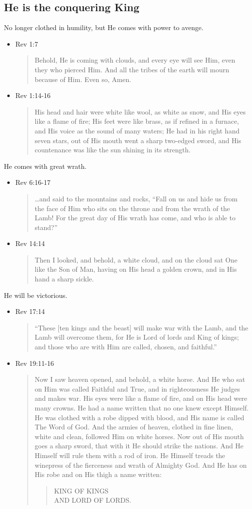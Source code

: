 \documentclass[12pt]{article}
\newcommand{\BI}{\begin{itemize}}
\newcommand{\EI}{\end{itemize}}
\newcommand{\I}{\item}
\newcommand{\Q}[1]{\begin{quote} #1 \end{quote}}
\begin{document}
\subsection{He is the conquering King}
\I No longer clothed in humility, but He comes with power to avenge.
\BI \I Rev 1:7 \Q{Behold, He is coming with clouds, and every eye will see Him, 
                even they who pierced Him. And all the tribes of the earth
                will mourn because of Him. Even so, Amen.}
    \I Rev 1:14-16 \Q{His head and hair were white like wool, as white as snow,
                and His eyes like a flame of fire; His feet were like brass, 
                as if refined in a furnace, and His voice as the sound of 
                many waters; He had in his right hand seven stars, 
                out of His mouth went a sharp two-edged sword, 
                and His countenance was like the sun shining in its strength.}
                \EI
\I He comes with great wrath.
\BI \I Rev 6:16-17 \Q{\ldots and said to the mountains and rocks, 
                ``Fall on us and hide us from the face of Him who sits on the
                throne and from the wrath of the Lamb! For the great day of His
                wrath has come, and who is able to stand?''}
    \I Rev 14:14 \Q{Then I looked, and behold, a white cloud, and on the cloud
                sat One like the Son of Man, having on His head a golden crown, 
                and in His hand a sharp sickle.} \EI
\I He will be victorious.
\BI \I Rev 17:14 \Q{``These [ten kings and the beast] will make war with 
                the Lamb, 
                and the Lamb will overcome them, for He is Lord of lords and
                King of kings; and those who are with Him are called, 
                chosen, and faithful.''}
    \I Rev 19:11-16 \Q{Now I saw heaven opened, and behold, a white horse.
                And He who sat on Him was called Faithful and True,
                and in righteousness He judges and makes war.
                His eyes were like a flame of fire, and on His head were
                many crowns. He had a name written that no one knew except
                Himself. He was clothed with a robe dipped with blood,
                and His name is called The Word of God.
                And the armies of heaven, clothed in fine linen, white and
                clean, followed Him on white horses.
                Now out of His mouth goes a sharp sword, that with it He 
                should strike the nations. And He Himself will rule them 
                with a rod of iron. He Himself treads the winepress of the
                fierceness and wrath of Almighty God. And He has on His robe 
                and on His thigh a name written:
                \Q{KING OF KINGS \\ AND LORD OF LORDS.}} \EI
\end{document}
